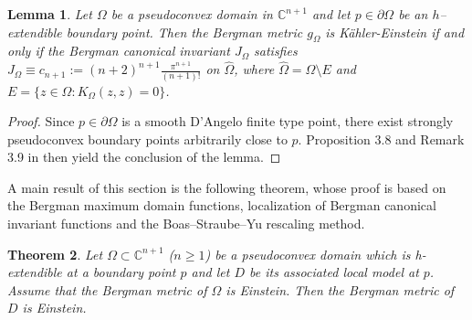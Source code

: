 \documentclass[a4paper,centertags,oneside,12pt]{amsart}
\newtheorem{theorem}{Theorem}[section]
\newtheorem{lemma}[theorem]{Lemma}
\numberwithin{equation}{section}
\begin{document}
\begin{lemma}\label{26-1-4-lem1}
Let $\Omega$ be a pseudoconvex domain in $\mathbb{C}^{n+1}$ and let $p \in \partial\Omega$ be an $h$--extendible boundary point. Then the Bergman metric $g_\Omega$ is Kähler-Einstein if and only if the Bergman canonical invariant $J_{\Omega}$ satisfies $J_{\Omega} \equiv c_{n+1} := (n+2)^{n+1}\frac{\pi^{n+1}}{(n+1)!}$ on $\widehat\Omega$, where $\widehat\Omega= \Omega \setminus E$ and $E = \{z \in \Omega : K_\Omega(z, z) = 0\}$.
\end{lemma}
\begin{proof}
    Since $p\in\partial\Omega$ is a smooth D'Angelo finite type point, there exist strongly pseudoconvex boundary points arbitrarily close to $p$. Proposition 3.8 and Remark 3.9 in \cite{HJL25} then yield the conclusion of the lemma.
\end{proof}
A main result of this section is the following theorem, whose proof  is based on  the  Bergman maximum domain functions, localization of Bergman canonical invariant functions and  the Boas--Straube--Yu \cite{BSY95} rescaling method.
\begin{theorem}\label{thm1-2-7}
    Let $\Omega\subset\mathbb C^{n+1}$ ($n\geq 1$) be a   pseudoconvex domain which is h-extendible at a boundary point $p$ and let $D$ be its associated local model at $p$. Assume that the Bergman metric of $\Omega$ is Einstein. Then the Bergman metric of $D$ is Einstein.
\end{theorem}
\end{document}
